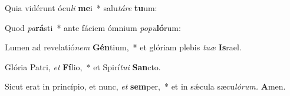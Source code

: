 \item Quia vidérunt ócu\textit{li} \textbf{me}i~* salu\tinyhspace\textit{táre} \textbf{tu}um:
\item Quod \textit{pa}\textbf{rá}sti~* ante fáciem ómnium \textit{popu}\textbf{ló}rum:
\item Lumen ad revelatió\textit{nem} \textbf{Gén}tium,~* et glóriam plebis \textit{tuæ} \textbf{Is}rael.
\item Glória Patri, \textit{et} \textbf{Fí}lio,~* et Spirí\textit{tui} \textbf{San}cto.
\item Sicut erat in princípio, et nunc, \textit{et} \textbf{sem}per,~* et in sǽcula sæcu\tinyhspace\textit{lórum.} \textbf{A}men.
